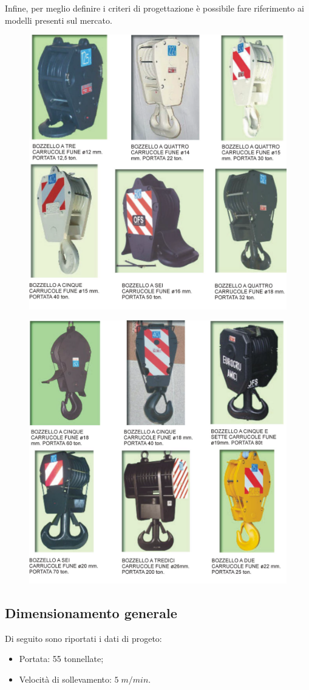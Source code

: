 Infine, per meglio definire i criteri di progettazione è possibile fare riferimento ai modelli presenti sul mercato. 
\begin{figure}[H]
\centering
  \includegraphics[width=.55\textwidth]{imgs/Esempi1}
\caption{}
\label{fig:Esempi1}
\end{figure}
\begin{figure}[H]
\centering
  \includegraphics[width=.55\textwidth]{imgs/Esempi2}
\caption{}
\label{fig:Esempi2}
\end{figure}
\subsection{Dimensionamento generale}
Di seguito sono riportati i dati di progeto:
\begin{itemize}
\item Portata: 55 tonnellate;
\item Velocità di sollevamento: $5 \; m/min$.
\end{itemize}


